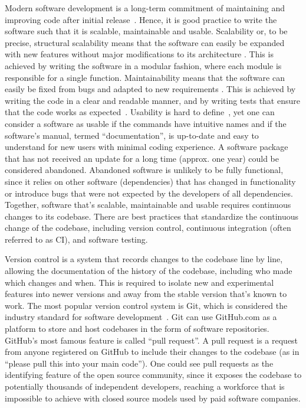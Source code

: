 Modern software development is a long-term commitment of maintaining and
improving code after initial release~\cite{boswellArtReadableCode2011}.
Hence, it is good practice to write the software such that it is
scalable, maintainable and usable. Scalability or, to be precise,
structural scalability means that the software can easily be expanded
with new features without major modifications to its architecture
\cite{bondiCharacteristicsScalabilityTheir2000}. This is achieved by
writing the software in a modular fashion, where each module is
responsible for a single function. Maintainability means that the
software can easily be fixed from bugs and adapted to new requirements
\cite{kazmanMaintainability2020}. This is achieved by writing the code
in a clear and readable manner, and by writing tests that ensure that
the code works as expected~\cite{boswellArtReadableCode2011}. Usability
is hard to define~\cite{brookeSUSQuickDirty1996}, yet one can consider a
software as usable if the commands have intuitive names and if the
software's manual, termed ``documentation'', is up-to-date and easy to
understand for new users with minimal coding experience. A software
package that has not received an update for a long time (approx. one
year) could be considered abandoned. Abandoned software is unlikely to
be fully functional, since it relies on other software (dependencies)
that has changed in functionality or introduce bugs that were not
expected by the developers of all dependencies. Together, software
that's scalable, maintainable and usable requires continuous changes to
its codebase. There are best practices that standardize the continuous
change of the codebase, including version control, continuous
integration (often referred to as CI), and software testing.

Version control is a system that records changes to the codebase line by
line, allowing the documentation of the history of the codebase,
including who made which changes and when. This is required to isolate
new and experimental features into newer versions and away from the
stable version that's known to work. The most popular version control
system is Git, which is considered the industry standard for software
development~\cite{chaconGitBook2024}. Git can use GitHub.com as a
platform to store and host codebases in the form of software
repositories. GitHub's most famous feature is called ``pull request''. A
pull request is a request from anyone registered on GitHub to include
their changes to the codebase (as in ``please pull this into your main
code''). One could see pull requests as the identifying feature of the
open source community, since it exposes the codebase to potentially
thousands of independent developers, reaching a workforce that is
impossible to achieve with closed source models used by paid software
companies.

